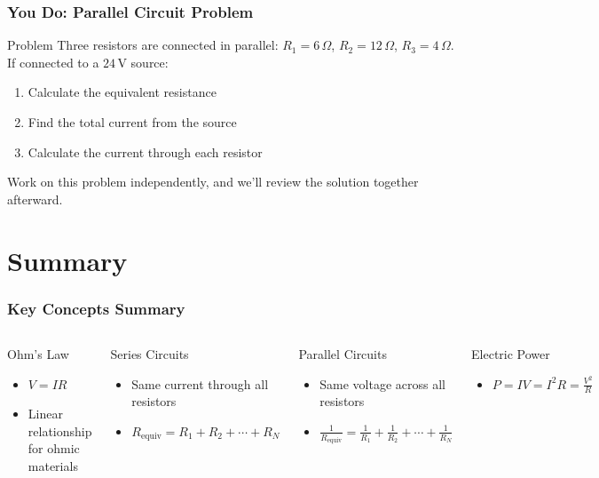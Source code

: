 \documentclass{beamer}
\begin{document}
\begin{frame}
\frametitle{You Do: Parallel Circuit Problem}
\begin{exampleblock}{Problem}
Three resistors are connected in parallel: $R_1 = 6 \, \Omega$, $R_2 = 12 \, \Omega$, $R_3 = 4 \, \Omega$. If connected to a $24 \, \text{V}$ source:
\begin{enumerate}
\item Calculate the equivalent resistance
\item Find the total current from the source
\item Calculate the current through each resistor
\end{enumerate}
\end{exampleblock}

Work on this problem independently, and we'll review the solution together afterward.
\end{frame}

\section{Summary}

\begin{frame}
\frametitle{Key Concepts Summary}
\begin{columns}
\begin{block}{Ohm's Law}
\begin{itemize}
\item $V = IR$
\item Linear relationship for ohmic materials
\end{itemize}
\end{block}

\begin{block}{Series Circuits}
\begin{itemize}
\item Same current through all resistors
\item $R_{\text{equiv}} = R_1 + R_2 + \cdots + R_N$
\end{itemize}
\end{block}

\begin{block}{Parallel Circuits}
\begin{itemize}
\item Same voltage across all resistors
\item $\frac{1}{R_{\text{equiv}}} = \frac{1}{R_1} + \frac{1}{R_2} + \cdots + \frac{1}{R_N}$
\end{itemize}
\end{block}

\begin{block}{Electric Power}
\begin{itemize}
\item $P = IV = I^2R = \frac{V^2}{R}$
\end{itemize}
\end{block}
\end{columns}
\end{frame}
\end{document}
